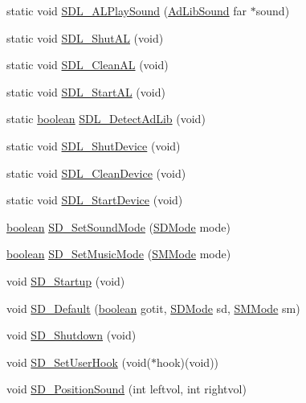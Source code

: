 \begin{DoxyCompactItemize}
\item 
static void \hyperlink{ID__SD_8C_a45e2c8d00474ded03c3203bb310089c4}{SDL\_\-ALPlaySound} (\hyperlink{structAdLibSound}{AdLibSound} far $\ast$sound)
\item 
static void \hyperlink{ID__SD_8C_a51fac7990ca45eb8b7f395f27fb11f7b}{SDL\_\-ShutAL} (void)
\item 
static void \hyperlink{ID__SD_8C_a10f2aeba6ae2fefe57a58e17199fbe4f}{SDL\_\-CleanAL} (void)
\item 
static void \hyperlink{ID__SD_8C_a3a39ea51ec25b1a106353d8cba49719f}{SDL\_\-StartAL} (void)
\item 
static \hyperlink{ID__HEAD_8H_a7c6368b321bd9acd0149b030bb8275ed}{boolean} \hyperlink{ID__SD_8C_adfbbcb05d81eca7c4367b5644dcbd4cb}{SDL\_\-DetectAdLib} (void)
\item 
static void \hyperlink{ID__SD_8C_aad3ecb7d81310a813ea9ba6efa0df733}{SDL\_\-ShutDevice} (void)
\item 
static void \hyperlink{ID__SD_8C_ab688129ab28069e8c512cdf561bc9c43}{SDL\_\-CleanDevice} (void)
\item 
static void \hyperlink{ID__SD_8C_abe37c30b8a1828d8e6b362c0a8321979}{SDL\_\-StartDevice} (void)
\item 
\hyperlink{ID__HEAD_8H_a7c6368b321bd9acd0149b030bb8275ed}{boolean} \hyperlink{ID__SD_8C_a5150708f32ce380003f87fe23288859a}{SD\_\-SetSoundMode} (\hyperlink{ID__SD_8H_af66c128f54042fe02b7297e3e29a8b6d}{SDMode} mode)
\item 
\hyperlink{ID__HEAD_8H_a7c6368b321bd9acd0149b030bb8275ed}{boolean} \hyperlink{ID__SD_8C_ab12f4ca416e4aa16d877ac310f7a6792}{SD\_\-SetMusicMode} (\hyperlink{ID__SD_8H_ac43ff64e0d1da85aa6fee6723a38a4de}{SMMode} mode)
\item 
void \hyperlink{ID__SD_8C_a9e273885efbb6410be25e887f5ac6bdd}{SD\_\-Startup} (void)
\item 
void \hyperlink{ID__SD_8C_a00b19d7c488bf8f1b9336e51831462c1}{SD\_\-Default} (\hyperlink{ID__HEAD_8H_a7c6368b321bd9acd0149b030bb8275ed}{boolean} gotit, \hyperlink{ID__SD_8H_af66c128f54042fe02b7297e3e29a8b6d}{SDMode} sd, \hyperlink{ID__SD_8H_ac43ff64e0d1da85aa6fee6723a38a4de}{SMMode} sm)
\item 
void \hyperlink{ID__SD_8C_ac6d96b7bc78afb4c50dba50009ea7cfa}{SD\_\-Shutdown} (void)
\item 
void \hyperlink{ID__SD_8C_aaa16861d631580a6d7abb257df4a9555}{SD\_\-SetUserHook} (void($\ast$hook)(void))
\item 
void \hyperlink{ID__SD_8C_a6709a4f68792058fd47b17196b876aee}{SD\_\-PositionSound} (int leftvol, int rightvol)

\end{DoxyCompactItemize}
